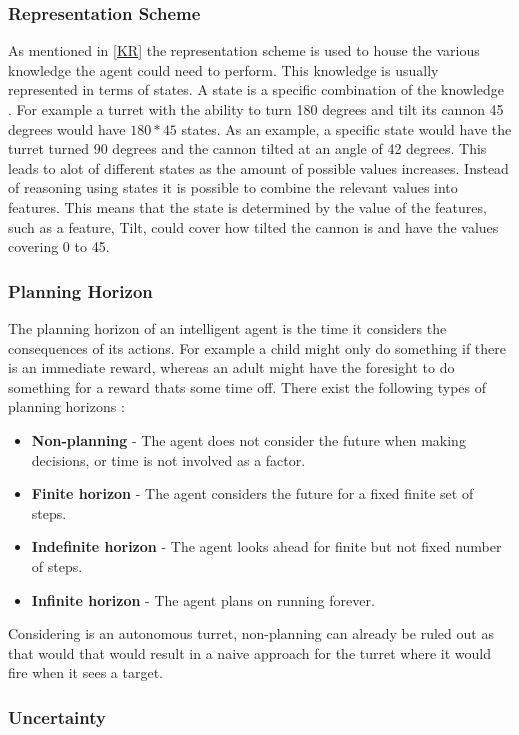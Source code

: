 \subsubsection{Representation Scheme}
As mentioned in \autoref{KR} the representation scheme is used to house the
various knowledge the agent could need to perform. This knowledge is usually
represented in terms of states. A state is a specific combination of
the knowledge \citep[Ch 1.5.2]{MIBook}. For example a turret with the ability
to turn 180 degrees and tilt its cannon 45 degrees would have $180 * 45$ states. As an example, a
specific state would have the turret turned 90 degrees and the cannon tilted at an angle of 42
degrees. This leads to alot of different states as the amount of possible values
increases. Instead of reasoning using states it is possible to combine the
relevant values into features. This means that the state is determined by the
value of the features, such as a feature, Tilt, could cover how tilted the
cannon is and have the values covering 0 to 45.

\subsubsection{Planning Horizon}
The planning horizon of an intelligent agent is the time it considers the
consequences of its actions. For example a child might only do something if
there is an immediate reward, whereas an adult might have the foresight to do
something for a reward thats some time off. There exist the following types of planning
horizons \citep[Ch 1.5.3]{MIBook}:
\begin{itemize}
	\item \textbf{Non-planning} - The agent does not consider the future when
	making decisions, or time is not involved as a factor.
	\item \textbf{Finite horizon} - The agent considers the future for a fixed
	finite set of steps. 
	\item \textbf{Indefinite horizon} - The agent looks ahead for finite but not
	fixed number of steps.
	\item \textbf{Infinite horizon} - The agent plans on running forever.	
\end{itemize}

Considering \name is an autonomous turret, non-planning can already be ruled
out as that would that would result in a naive approach for the turret where it
would fire when it sees a target.

\subsubsection{Uncertainty}

